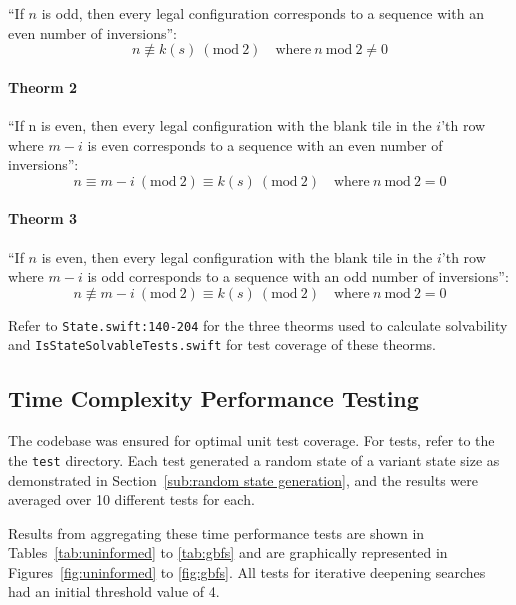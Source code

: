``If $n$ is odd, then every legal configuration corresponds to a sequence with an even number of inversions'':
\begin{equation}
  n \not\equiv k(s) \ (\text{mod}\ 2) \quad \text{where} \ n \ \text{mod} \ 2 \neq 0
\end{equation}

\paragraph{Theorm 2}
\label{par:Theorm 2}

``If n is even, then every legal configuration with the blank tile in the
$i$'th row where $m-i$ is even corresponds to a sequence with an even
number of inversions'':
\begin{equation}
  n \equiv m-i \ (\text{mod}\ 2) \equiv k(s) \ (\text{mod}\ 2) \quad \text{where} \ n \ \text{mod} \ 2 = 0
\end{equation}

\paragraph{Theorm 3}
\label{par:Theorm 3}

``If $n$ is even, then every legal configuration with the blank tile in the
$i$'th row where $m-i$ is odd corresponds to a sequence with an odd
number of inversions'':
\begin{equation}
  n \not\equiv m-i \ (\text{mod}\ 2) \equiv k(s) \ (\text{mod}\ 2) \quad \text{where} \ n \ \text{mod} \ 2 = 0
\end{equation}

Refer to
\texttt{State.swift:140-204} for the three theorms used to calculate solvability
and \texttt{IsStateSolvableTests.swift} for test coverage of these theorms.

\subsection{Time Complexity Performance Testing}
\label{sub:time performance tests}

The codebase was ensured for optimal unit test coverage. For tests, refer to
the the \texttt{test} directory. Each test generated a random state of a variant
state size as demonstrated in Section~\ref{sub:random state generation}, and the
results were averaged over 10 different tests for each.

Results from aggregating these time performance tests are
shown in Tables~\ref{tab:uninformed} to \ref{tab:gbfs} and are graphically
represented in Figures~\ref{fig:uninformed} to \ref{fig:gbfs}. All tests for
iterative deepening searches had an initial threshold value of 4.


